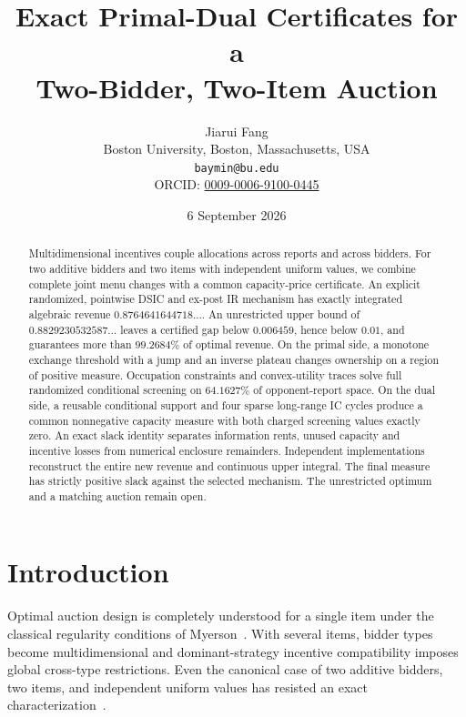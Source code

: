\documentclass[11pt]{article}
\title{Exact Primal-Dual Certificates for a\\
Two-Bidder, Two-Item Auction}
\author{Jiarui Fang\\
Boston University, Boston, Massachusetts, USA\\
\texttt{baymin@bu.edu}\\
ORCID: \href{https://orcid.org/0009-0006-9100-0445}{0009-0006-9100-0445}}
\date{6 September 2026}
\begin{document}
\maketitle

\begin{abstract}
Multidimensional incentives couple allocations across reports and across bidders.
For two additive bidders and two items with independent uniform values, we
combine complete joint menu changes with a common capacity-price certificate.
An explicit randomized, pointwise DSIC and ex-post IR mechanism has exactly
integrated algebraic revenue $0.8764641644718\ldots$. An unrestricted
upper bound of $0.8829230532587\ldots$ leaves a certified gap below
$0.006459$, hence below $0.01$, and guarantees more than $99.2684\%$ of optimal
revenue. On the primal side, a monotone exchange threshold with a jump and
an inverse plateau changes ownership on a region of positive measure.
Occupation constraints and convex-utility traces solve full randomized
conditional screening on $64.1627\%$ of opponent-report space. On the dual
side, a reusable conditional support and four sparse long-range IC cycles
produce a common nonnegative capacity measure with both charged screening
values exactly zero. An exact slack identity separates information rents,
unused capacity and incentive losses from numerical enclosure remainders.
Independent implementations reconstruct the entire new revenue and continuous
upper integral. The final measure has strictly positive slack against the
selected mechanism. The unrestricted optimum and a matching auction remain open.
\end{abstract}

\section{Introduction}

Optimal auction design is completely understood for a single item under the
classical regularity conditions of Myerson~\citep{myerson1981}.  With several
items, bidder types become multidimensional and dominant-strategy incentive
compatibility imposes global cross-type restrictions.  Even the canonical
case of two additive bidders, two items, and independent uniform values has
resisted an exact characterization~\citep{sandholm2015,jiang2026duality}.
\end{document}
